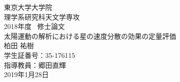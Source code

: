 \begin{titlepage}
\begin{spacing}{2.3}

\begin{center}
\vspace*{80truept}
{\huge 東京大学大学院}\\
{\huge 理学系研究科天文学専攻}\\
\vspace{20truept}
{\huge 2018年度 \ 修士論文}\\
\vspace{50truept}
{\huge 太陽運動の解析における星の速度分散の効果の定量評価}\\
\vspace{100truept}
{\LARGE 柏田 祐樹}\\ %
{\LARGE 学生証番号：35-176115}\\ %
{\LARGE 指導教員：郷田直輝}\\ %
{\LARGE 2019年1月28日}\\ %
\end{center}

\end{spacing}
\end{titlepage}